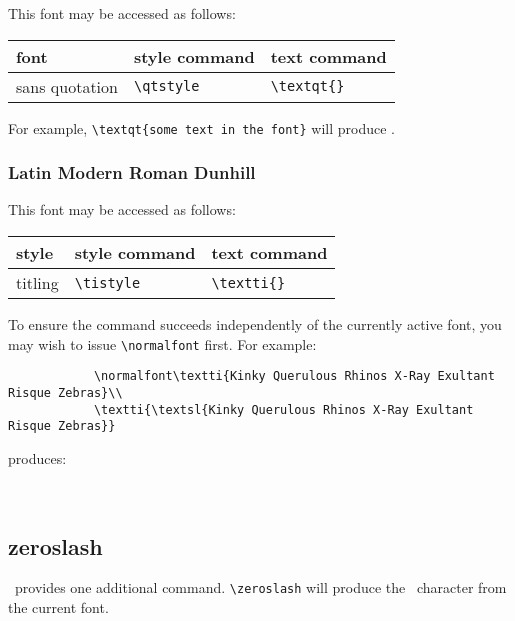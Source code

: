 \documentclass[11pt,british]{article}
\begin{document}
This font may be accessed as follows:
	\begin{longtable}{lll}
		\toprule
		\textbf{font}			&	\textbf{style command}	&	\textbf{text command}\\\midrule\endhead
		\bottomrule\endfoot
		sans quotation			&	\verb|\qtstyle|					&	\verb|\textqt{}|				
	\end{longtable}

For example, \verb|\textqt{some text in the font}| will produce .
	
\subsubsection{Latin Modern Roman Dunhill}

This font may be accessed as follows:
	\begin{longtable}{lll}
		\toprule
		\textbf{style}			&	\textbf{style command}	&	\textbf{text command}\\\midrule\endhead
		\bottomrule\endfoot
		titling							&	\verb|\tistyle|						&	\verb|\textti{}|\\
	\end{longtable}
		
To ensure the command succeeds independently of the currently active font, you may wish to issue \verb|\normalfont| first. For example:
		\begin{verbatim}
			\normalfont\textti{Kinky Querulous Rhinos X-Ray Exultant Risque Zebras}\\
			\textti{\textsl{Kinky Querulous Rhinos X-Ray Exultant Risque Zebras}}
		\end{verbatim}
		produces:
		\begin{center}
		 	\normalfont{}\\
		\end{center}	
	
\subsection{zeroslash}
	
\ provides one additional command. \verb|\zeroslash| will produce the \zeroslash\ character from the current font.
	
\end{document}
